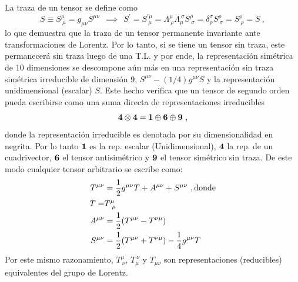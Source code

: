 La traza de un tensor se define como 
\begin{equation}
    S \equiv S^{\mu}_{~\mu}=g_{\mu \nu}S^{\mu \nu} ~~\implies~~ S^{\prime}=S^{ \prime \mu}_{~\mu}=\Lambda^{\mu}_{~\rho}\Lambda_{\mu}^{~\sigma} S^{\rho}_{~\sigma}=\delta^{\sigma}_{\rho}S^{\rho}_{~\sigma} = S^{\rho}_{~\rho}=S~,
\end{equation}
 lo que demuestra que la traza de un tensor permanente invariante ante transformaciones de Lorentz. Por lo tanto, si se tiene un tensor sin traza, este permanecerá sin traza luego de una T.L. y por ende, la representación simétrica de 10 dimensiones se descompone aún más en una representación sin traza simétrica irreducible de dimensión 9, $S^{\mu \nu}-(1/4)g^{\mu \nu}S$ y la representación unidimensional (escalar) $S$. Este hecho verifica que un tensor de segundo orden pueda escribirse como una suma directa de representaciones irreducibles
 \begin{equation}
     \vb*{4} \otimes \vb*{4} = \vb*{1} \oplus \vb*{6} \oplus \vb*{9}~,
 \end{equation}
donde la representación irreducible es denotada por su dimensionalidad en negrita. Por lo tanto $\vb*{1}$ es la rep. escalar (Unidimensional), $\vb*{4}$ la rep. de un cuadrivector, $\vb*{6}$ el tensor antisimétrico y $\vb*{9}$ el tensor simétrico sin traza. De este modo cualquier tensor arbitrario se escribe como:
\begin{equation}
\begin{split}
    T^{\mu \nu} &= \frac{1}{2}g^{ \mu \nu}T+A^{\mu \nu} + S^{ \mu \nu}~,  \text{donde}\\
    T =& T^{\mu}_{~\mu}\\
    A^{\mu \nu} &=\frac{1}{2}\qty(T^{\mu \nu} - T^{\nu \mu})\\
    S^{\mu \nu} &=\frac{1}{2}\qty(T^{\mu \nu} + T^{\nu \mu})-\frac{1}{4}g^{\mu \nu}T
\end{split}
\end{equation}
 Por este mismo razonamiento, $T^{\mu}_{~\nu}$, $T_{\mu}^{~\nu}$ y $T_{\mu \nu}$ son representaciones (reducibles) equivalentes del grupo de Lorentz.\\

